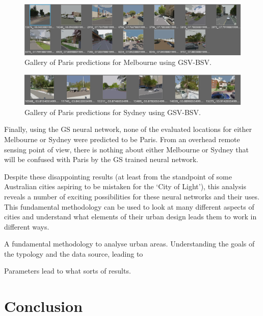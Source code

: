 \documentclass[sageh,times]{sagej}
\begin{document}
\begin{figure}[!htbp]
\centering    
\includegraphics[scale=0.50]{Images/MelbourneLikeParis/Melbourne_streetview_gallery.png} 
\caption{Gallery of Paris predictions for Melbourne using GSV-BSV.}    
 \label{fig:gsv_mel_gallery}  
\end{figure} 

\begin{figure}[!htbp]
\centering    
\includegraphics[scale=0.50]{Images/SydneyLikeParis/Sydney_streetview_gallery.png} 
\caption{Gallery of Paris predictions for Sydney using GSV-BSV.}    
 \label{fig:gsv_syd_gallery}  
\end{figure} 



Finally, using the GS neural network, none of the evaluated locations for either Melbourne or Sydney were predicted to be Paris. From an overhead remote sensing point of view, there is nothing about either Melbourne or Sydney that will be confused with Paris by the GS trained neural network. 

Despite these disappointing results (at least from the standpoint of some Australian cities aspiring to be mistaken for the `City of Light'), this analysis reveals a number of exciting possibilities for these neural networks and their uses. This fundamental methodology can be used to look at many different aspects of cities and understand what elements of their urban design leads them to work in different ways.








A fundamental methodology to analyse urban areas. Understanding the goals of the typology and the data source, leading to 

Parameters lead to what sorts of results.










\section{Conclusion}\label{sec:conclusion}


  
  
\end{document}
